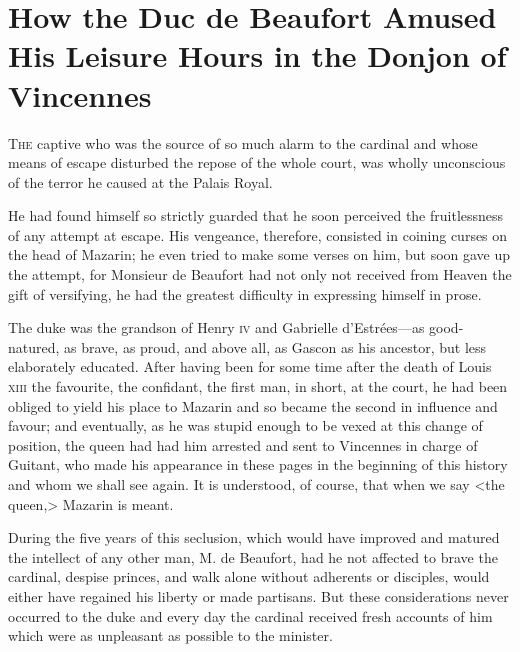 \chapter[The Duc de Beaufort in the Donjon of Vincennes]{How the Duc de Beaufort Amused His Leisure Hours in the Donjon of Vincennes}


 \lettrine{T}{he} captive who was the source of so much alarm to the cardinal and whose means of escape disturbed the repose of the whole court, was wholly unconscious of the terror he caused at the Palais Royal.

\zz
He had found himself so strictly guarded that he soon perceived the fruitlessness of any attempt at escape. His vengeance, therefore, consisted in coining curses on the head of Mazarin; he even tried to make some verses on him, but soon gave up the attempt, for Monsieur de Beaufort had not only not received from Heaven the gift of versifying, he had the greatest difficulty in expressing himself in prose.

The duke was the grandson of Henry \textsc{iv} and Gabrielle d'Estrées—as good-natured, as brave, as proud, and above all, as Gascon as his ancestor, but less elaborately educated. After having been for some time after the death of Louis \textsc{xiii} the favourite, the confidant, the first man, in short, at the court, he had been obliged to yield his place to Mazarin and so became the second in influence and favour; and eventually, as he was stupid enough to be vexed at this change of position, the queen had had him arrested and sent to Vincennes in charge of Guitant, who made his appearance in these pages in the beginning of this history and whom we shall see again. It is understood, of course, that when we say <the queen,> Mazarin is meant.

During the five years of this seclusion, which would have improved and matured the intellect of any other man, M. de Beaufort, had he not affected to brave the cardinal, despise princes, and walk alone without adherents or disciples, would either have regained his liberty or made partisans. But these considerations never occurred to the duke and every day the cardinal received fresh accounts of him which were as unpleasant as possible to the minister.

